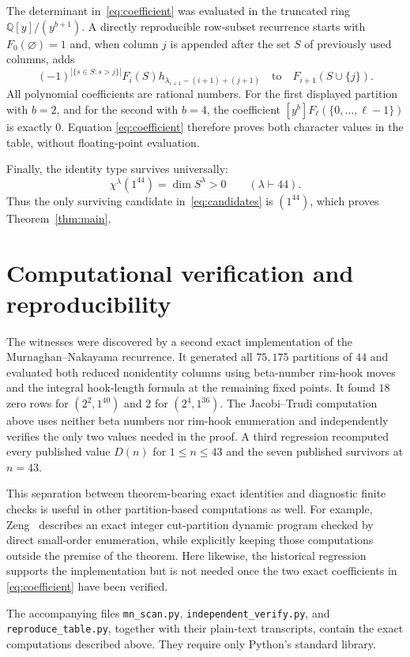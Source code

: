 \documentclass[11pt]{article}
\begin{document}
The determinant in~\eqref{eq:coefficient} was evaluated in the truncated
ring $\mathbb Q[y]/(y^{b+1})$.  A directly reproducible row-subset recurrence
starts with $F_0(\varnothing)=1$ and, when column $j$ is appended after the
set $S$ of previously used columns, adds
\[
 (-1)^{|\{s\in S:s>j\}|}F_i(S)h_{\lambda_{i+1}-(i+1)+(j+1)}
 \quad\text{to}\quad F_{i+1}(S\cup\{j\}).
\]
All polynomial coefficients are rational numbers.  For the first displayed
partition with $b=2$, and for the second with $b=4$, the coefficient
$[y^b]F_\ell(\{0,\ldots,\ell-1\})$ is exactly $0$.  Equation
\eqref{eq:coefficient} therefore proves both character values in the table,
without floating-point evaluation.

Finally, the identity type survives universally:
\[
              \chi^\lambda(1^{44})=\dim S^\lambda>0
              \qquad(\lambda\vdash44).
\]
Thus the only surviving candidate in~\eqref{eq:candidates} is $(1^{44})$,
which proves Theorem~\ref{thm:main}.

\section{Computational verification and reproducibility}

The witnesses were discovered by a second exact implementation of the
Murnaghan--Nakayama recurrence.  It generated all $75{,}175$ partitions of
$44$ and evaluated both reduced nonidentity columns using beta-number rim-hook
moves and the integral hook-length formula at the remaining fixed points.  It
found $18$ zero rows for $(2^2,1^{40})$ and $2$ for $(2^4,1^{36})$.  The
Jacobi--Trudi computation above uses neither beta numbers nor rim-hook
enumeration and independently verifies the only two values needed in the
proof.  A third regression recomputed every published value $D(n)$ for
$1\le n\le43$ and the seven published survivors at $n=43$.

This separation between theorem-bearing exact identities and diagnostic
finite checks is useful in other partition-based computations as well.  For
example, Zeng~\cite[Section~4]{Zeng2026MultiplicityArxiv} describes an exact
integer cut-partition dynamic program checked by direct small-order
enumeration, while explicitly keeping those computations outside the premise
of the theorem.  Here likewise, the historical regression supports the
implementation but is not needed once the two exact coefficients in
\eqref{eq:coefficient} have been verified.

The accompanying files \texttt{mn\_scan.py},
\texttt{independent\_verify.py}, and \texttt{reproduce\_table.py}, together
with their plain-text transcripts, contain the exact computations described
above.  They require only Python's standard library.
\end{document}
